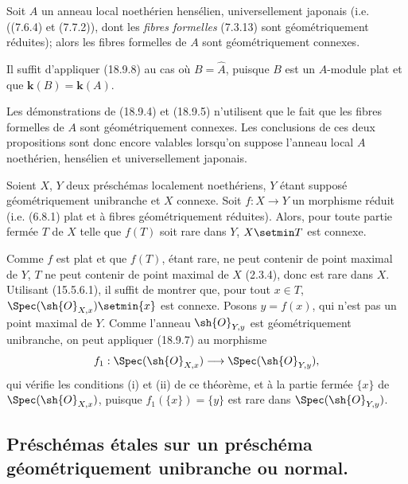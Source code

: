 \begin{corollary}[18.9.9]
\label{IV.18.9.9}
Soit $A$ un anneau local noethérien hensélien, universellement japonais \textup{(i.e. ((7.6.4) et (7.7.2)), dont les \emph{fibres formelles} (7.3.13) sont géométriquement réduites)}; alors les fibres formelles de $A$ sont géométriquement connexes.
\end{corollary}

Il suffit d'appliquer (18.9.8) au cas où $B=\widehat A$, puisque $B$ est un $A$-module plat et que $\boldsymbol{k}(B)=\boldsymbol{k}(A)$.

\begin{remark}[18.9.10]
\label{IV.18.9.10}
Les démonstrations de (18.9.4) et (18.9.5) n'utilisent que le fait que les fibres formelles de $A$ sont géométriquement connexes. Les conclusions
de ces deux propositions sont donc encore valables lorsqu'on suppose l'anneau local $A$ noethérien, hensélien et universellement japonais.
\end{remark}

\begin{corollary}[18.9.11]
\label{IV.18.9.11}
Soient $X$, $Y$ deux préschémas localement noethériens, $Y$ étant supposé géométriquement unibranche et $X$ connexe. Soit $f:X\to Y$ un morphisme réduit \textup{(i.e. (6.8.1) plat et à fibres géométriquement réduites)}. Alors, pour toute partie fermée $T$ de $X$ telle que $f(T)$ soit rare dans $Y$, $X\setmin T$ est connexe.
\end{corollary}

Comme $f$ est plat et que $f(T)$, étant rare, ne peut contenir de point maximal de $Y$, $T$ ne peut contenir de point maximal de $X$ (2.3.4), donc est rare dans $X$. Utilisant (15.5.6.1), il suffit de montrer que, pour tout $x\in T$, $\Spec(\sh{O}_{X,x})\setmin\{x\}$ est connexe. Posons $y=f(x)$, qui n'est pas un point maximal de $Y$. Comme l'anneau $\sh{O}_{Y,y}$ est géométriquement unibranche, on peut appliquer (18.9.7) au morphisme
\[
  f_1:\Spec(\sh{O}_{X,x})\longrightarrow\Spec(\sh{O}_{Y,y}),
\]
qui vérifie les conditions (i) et (ii) de ce théorème, et à la partie fermée $\{x\}$ de $\Spec(\sh{O}_{X,x})$, puisque $f_1(\{x\})=\{y\}$ est rare dans $\Spec(\sh{O}_{Y,y})$.

\subsection{Préschémas étales sur un préschéma géométriquement unibranche ou normal.}

